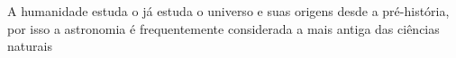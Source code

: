 A humanidade estuda o já estuda o universo e suas origens desde a pré-história, por isso a astronomia é frequentemente considerada a mais antiga das ciências naturais